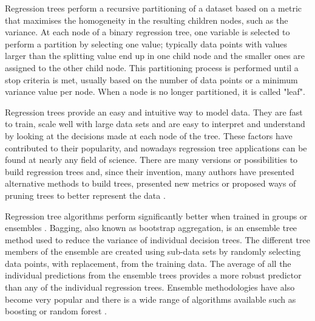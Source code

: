 \medskip

Regression trees perform a recursive partitioning of a dataset based on a metric that maximises the homogeneity in the resulting children nodes, such as the variance. At each node of a binary regression tree, one variable is selected to perform a partition by selecting one value; typically data points with values larger than the splitting value end up in one child node and the smaller ones are assigned to the other child node. This partitioning process is performed until a stop criteria is met, usually based on the number of data points or a minimum variance value per node. When a node is no longer partitioned, it is called "leaf".

\medskip

Regression trees provide an easy and intuitive way to model data. They are fast to train, scale well with large data sets and are easy to interpret and understand by looking at the decisions made at each node of the tree. These factors have contributed to their popularity, and nowadays regression tree applications can be found at nearly any field of science. There are many versions or possibilities to build regression trees and, since their invention, many authors have presented alternative methods to build trees, presented new metrics or proposed ways of pruning trees to better represent the data \citep{quinlan1993,freund1999alternating}. 

\medskip

Regression tree algorithms perform significantly better when trained in groups or ensembles \citep{breiman1996bagging}. Bagging, also known as bootstrap aggregation, is an ensemble tree method used to reduce the variance of individual decision trees. The different tree members of the ensemble are created using sub-data sets by randomly selecting data points, with replacement, from the training data. The average of all the individual predictions from the ensemble trees provides a more robust predictor than any of the individual regression trees. Ensemble methodologies have also become very popular and there is a wide range of algorithms available such as boosting or random forest \citep{dietterich2000experimental,breiman2001random}.

\bigskip
\bigskip



